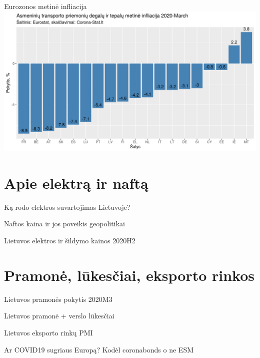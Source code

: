 \documentclass[11pt]{beamer}
\begin{document}
\begin{frame}{Eurozonos metinė infliacija}
\includegraphics[scale=0.5]{infliacija_degalai.png}
\end{frame}


\section{Apie elektrą ir naftą}
\begin{frame}{Ką rodo elektros suvartojimas Lietuvoje?}
\end{frame}

\begin{frame}{Naftos kaina ir jos poveikis geopolitikai}
\end{frame}

\begin{frame}{Lietuvos elektros ir šildymo kainos 2020H2}
\end{frame}

\section{Pramonė, lūkesčiai, eksporto rinkos}
\begin{frame}{Lietuvos pramonės pokytis 2020M3}
\end{frame}

\begin{frame}{Lietuvos pramonė + verslo lūkesčiai}
\end{frame}

\begin{frame}{Lietuvos eksporto rinkų PMI}
\end{frame}

\begin{frame}{Ar COVID19 sugriaus Europą?}
Kodėl coronabonds o ne ESM
\end{frame}
\end{document}
